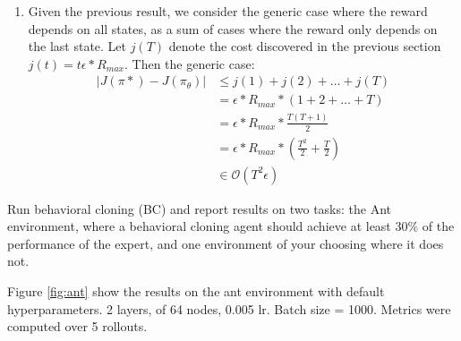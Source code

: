 \documentclass[11pt]{article}
\begin{document}
\begin{enumerate}
\begin{enumerate}
        \item Given the previous result, we consider the generic case where the reward depends on all states, as a sum of cases where the reward only depends on the last state.
        Let $j(T)$ denote the cost discovered in the previous section $j(t) = t \epsilon * R_{max}$.  Then the generic case:
        \begin{align*}
            |J(\pi*) - J(\pi_\theta)| &\leq j(1) + j(2) + \dots + j(T)\\
            &= \epsilon * R_{max} * (1 + 2 + \dots + T)\\
            &= \epsilon * R_{max} * \frac{T(T+1)}{2}\\
            &= \epsilon * R_{max} * \left(\frac{T^2}{2} + \frac{T}{2} \right)\\
            &\in \mathcal{O}(T^2 \epsilon)    
        \end{align*}
    \end{enumerate}
    
\end{enumerate}


Run behavioral cloning (BC) and report results on two tasks: the Ant environment, where
a behavioral cloning agent should achieve at least 30\% of the performance of the expert, and
one environment of your choosing where it does not.
\soln

Figure \ref{fig:ant} show the results on the ant environment with default hyperparameters.
2 layers, of 64 nodes, 0.005 lr. Batch size = 1000. Metrics were computed over 5 rollouts.
\end{document}
